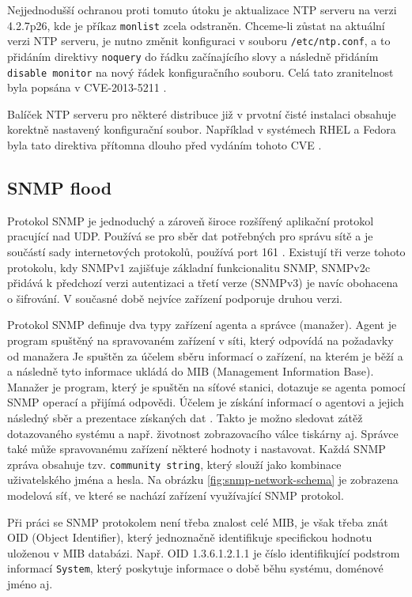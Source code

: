 Nejjednodušší ochranou proti tomuto útoku je aktualizace NTP serveru na verzi 4.2.7p26, kde
je příkaz \texttt{monlist} zcela odstraněn. Chceme-li zůstat na aktuální verzi NTP serveru,
je nutno změnit konfiguraci v souboru \texttt{/etc/ntp.conf}, a to přidáním direktivy
\texttt{noquery} do řádku začínajícího slovy  a následně přidáním
\texttt{disable monitor} na nový řádek konfiguračního souboru. 
Celá tato zranitelnost byla popsána v CVE-2013-5211 \cite{CVE-2013-5211}.

Balíček NTP serveru pro některé distribuce již v prvotní čisté instalaci obsahuje korektně
nastavený konfigurační soubor. Například v systémech RHEL a Fedora byla tato direktiva
přítomna dlouho před vydáním tohoto CVE \cite{RHBZ1047854}.

\subsection{SNMP flood}
\label{subsec:snmp_flood}
Protokol SNMP je jednoduchý a zároveň široce rozšířený aplikační protokol pracující nad UDP. Používá se pro sběr dat potřebných pro správu sítě a je součástí sady internetových protokolů, používá port 161 \cite{rfc1157}. Existují tři verze tohoto protokolu, kdy SNMPv1 zajišťuje základní funkcionalitu SNMP, SNMPv2c přidává k předchozí verzi autentizaci a třetí verze (SNMPv3) je navíc obohacena o šifrování. V současné době nejvíce zařízení podporuje druhou verzi.

Protokol SNMP definuje dva typy zařízení agenta a správce (manažer). Agent je program spuštěný na spravovaném zařízení v síti, který odpovídá na požadavky od manažera Je spuštěn za účelem sběru informací o zařízení, na kterém je běží a a následně tyto informace ukládá do MIB (Management Information Base). Manažer je program, který je spuštěn na síťové stanici, dotazuje se agenta pomocí SNMP operací a přijímá odpovědi. Účelem je získání informací o agentovi a jejich následný sběr a prezentace získaných dat \cite{Skrivanek2006}. Takto je možno sledovat zátěž dotazovaného systému a např. životnost zobrazovacího válce tiskárny aj. Správce také může spravovanému zařízení některé hodnoty i nastavovat. Každá SNMP zpráva obsahuje tzv. \texttt{community string}, který slouží jako kombinace uživatelského jména a hesla. Na obrázku \ref{fig:snmp-network-schema} je zobrazena modelová síť, ve které se nachází zařízení využívající SNMP protokol.

Při práci se SNMP protokolem není třeba znalost celé MIB, je však třeba znát OID (Object Identifier), který jednoznačně identifikuje specifickou hodnotu uloženou v MIB databázi. Např. OID 1.3.6.1.2.1.1 je číslo identifikující podstrom informací \texttt{System}, který poskytuje informace o době běhu systému, doménové jméno aj.

